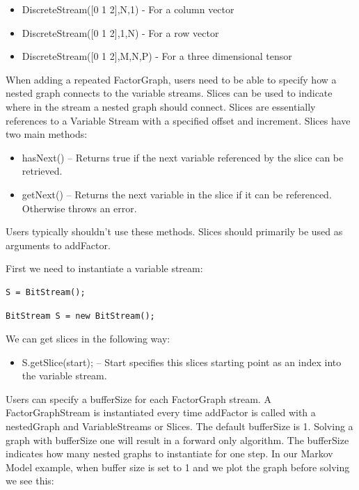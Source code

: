 \begin{itemize}
\item DiscreteStream([0 1 2],N,1) - For a column vector
\item DiscreteStream([0 1 2],1,N) - For a row vector
\item DiscreteStream([0 1 2],M,N,P) - For a three dimensional tensor
\end{itemize}

\fi

When adding a repeated FactorGraph, users need to be able to specify how a nested graph connects to the variable streams.  Slices can be used to indicate where in the stream a nested graph should connect.  Slices are essentially references to a Variable Stream with a specified offset and increment.  Slices have two main methods:

\begin{itemize}
\item hasNext() -- Returns true if the next variable referenced by the slice can be retrieved.
\item getNext() -- Returns the next variable in the  slice if it can be referenced.  Otherwise throws an error.
\end{itemize}

Users typically shouldn't use these methods.  Slices should primarily be used as arguments to addFactor.

First we need to instantiate a variable stream:

\ifmatlab
\begin{lstlisting}
S = BitStream();
\end{lstlisting}
\fi

\ifjava
\begin{lstlisting}
BitStream S = new BitStream();
\end{lstlisting}
\fi


We can get slices in the following way:

\begin{itemize}

\item S.getSlice(start); -- Start specifies this slices starting point as an index into the variable stream.
\end{itemize}


Users can specify a bufferSize for each FactorGraph stream.  A FactorGraphStream is instantiated every time addFactor is called with a nestedGraph and VariableStreams or Slices.  The default bufferSize is 1.  Solving a graph with bufferSize one will result in a forward only algorithm.  The bufferSize indicates how many nested graphs to instantiate for one step.  In our Markov Model example, when buffer size is set to 1 and we plot the graph before solving we see this:

